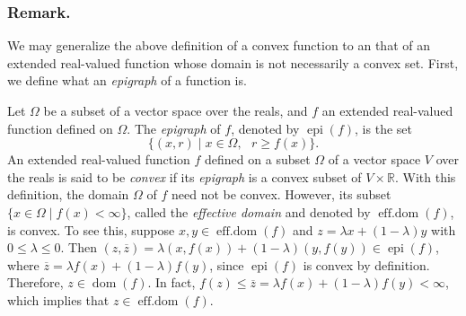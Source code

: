 \documentclass[12pt]{article}
\begin{document}
\subsubsection*{Remark.}  
We may generalize the above definition of a convex function to an that of an extended real-valued function whose domain is not necessarily a convex set.  First, we define what an \emph{epigraph} of a function is.

Let $\Omega$ be a subset of a vector space over the reals, and $f$ an extended real-valued function defined on $\Omega$.  The \emph{epigraph} of $f$, denoted by $\operatorname{epi}(f)$, is the set 
$$\lbrace (x,r)\mid x\in \Omega,\mbox{ } r\ge f(x)\rbrace.$$
An extended real-valued function $f$ defined on a subset $\Omega$ of a vector space $V$ over the reals is said to be \emph{convex} if its \emph{epigraph} is a convex subset of $V\times\mathbb{R}$.  With this definition, the domain $\Omega$ of $f$ need not be convex.  However, its subset $\lbrace x\in \Omega\mid f(x) < \infty\rbrace$, called the \emph{effective domain} and denoted by $\operatorname{eff.dom}(f)$, is convex.  To see this, suppose $x,y\in \operatorname{eff.dom}(f)$ and $z=\lambda x+(1-\lambda) y$ with $0\le \lambda \le 0$.  Then $ (z,\overline{z})=\lambda(x,f(x))+(1-\lambda)(y,f(y))\in \operatorname{epi}(f)$, where $\overline{z}=\lambda f(x)+(1-\lambda)f(y)$, since $\operatorname{epi}(f)$ is convex by definition.  Therefore, $z\in \operatorname{dom}(f)$.  In fact, $f(z)\le \overline{z}=\lambda f(x)+(1-\lambda)f(y)<\infty$, which implies that $z\in \operatorname{eff.dom}(f)$.
\end{document}
